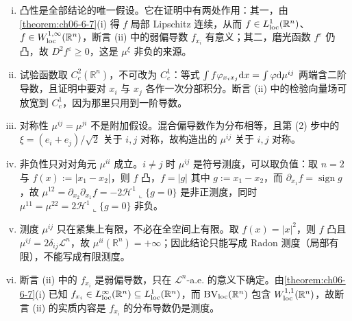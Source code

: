 \documentclass[../../main.tex]{subfiles}%
\begin{document}
\begin{remark}\label{remark:ch06-thm-6-8-条件}
\begin{enumerate}[(i)]
\item 凸性是全部结论的唯一假设。它在证明中有两处作用：其一，由\cref{theorem:ch06-6-7}(i) 得 $f$ 局部 Lipschitz 连续，从而 $f\in L^{1}_{\mathrm{loc}}(\mathbb{R}^n)$、$f\in W^{1,\infty}_{\mathrm{loc}}(\mathbb{R}^n)$，断言 (ii) 中的弱偏导数 $f_{x_i}$ 有意义；其二，磨光函数 $f^{\varepsilon}$ 仍凸，故 $D^{2}f^{\varepsilon}\geqslant0$，这是 $\mu^{\xi}$ 非负的来源。%
\item 试验函数取 $C_c^{2}(\mathbb{R}^n)$，不可改为 $C_c^{1}$：等式 $\int f\varphi_{x_ix_j}\mathrm{d} x=\int\varphi\mathrm{d}\mu^{ij}$ 两端含二阶导数，且证明中要对 $x_i$ 与 $x_j$ 各作一次分部积分。断言 (ii) 中的检验向量场可放宽到 $C_c^{1}$，因为那里只用到一阶导数。
\item 对称性 $\mu^{ij}=\mu^{ji}$ 不是附加假设。混合偏导数作为分布相等，且第 (2) 步中的 $\xi=(e_i+e_j)/\sqrt2$ 关于 $i,j$ 对称，故构造出的 $\mu^{ij}$ 关于 $i,j$ 对称。
\item 非负性只对对角元 $\mu^{ii}$ 成立。$i\neq j$ 时 $\mu^{ij}$ 是符号测度，可以取负值：取 $n=2$ 与 $f(x):=\lvert x_1-x_2\rvert$，则 $f$ 凸，$f=\lvert g\rvert$ 其中 $g:=x_1-x_2$，而 $\partial_{x_1}f=\operatorname{sign}g$，故 $\mu^{12}=\partial_{x_2}\partial_{x_1}f=-2\mathcal{H}^{1}\llcorner\{g=0\}$ 是非正测度，同时 $\mu^{11}=\mu^{22}=2\mathcal{H}^{1}\llcorner\{g=0\}$ 非负。
\item 测度 $\mu^{ij}$ 只在紧集上有限，不必在全空间上有限。取 $f(x)=\lvert x\rvert^{2}$，则 $f$ 凸且 $\mu^{ij}=2\delta_{ij}\mathcal{L}^{n}$，故 $\mu^{ii}(\mathbb{R}^n)=+\infty$；因此结论只能写成 Radon 测度（局部有限），不能写成有限测度。
\item 断言 (ii) 中的 $f_{x_i}$ 是弱偏导数，只在 $\mathcal{L}^{n}$-a.e. 的意义下确定。由\cref{theorem:ch06-6-7}(i) 已知 $f_{x_i}\in L^{\infty}_{\mathrm{loc}}(\mathbb{R}^n)\subseteq L^{1}_{\mathrm{loc}}(\mathbb{R}^n)$，而 $\mathrm{BV}_{\mathrm{loc}}(\mathbb{R}^n)$ 包含 $W^{1,1}_{\mathrm{loc}}(\mathbb{R}^n)$，故断言 (ii) 的实质内容是 $f_{x_i}$ 的分布导数仍是测度。%
\end{enumerate}
\end{remark}
\end{document}
